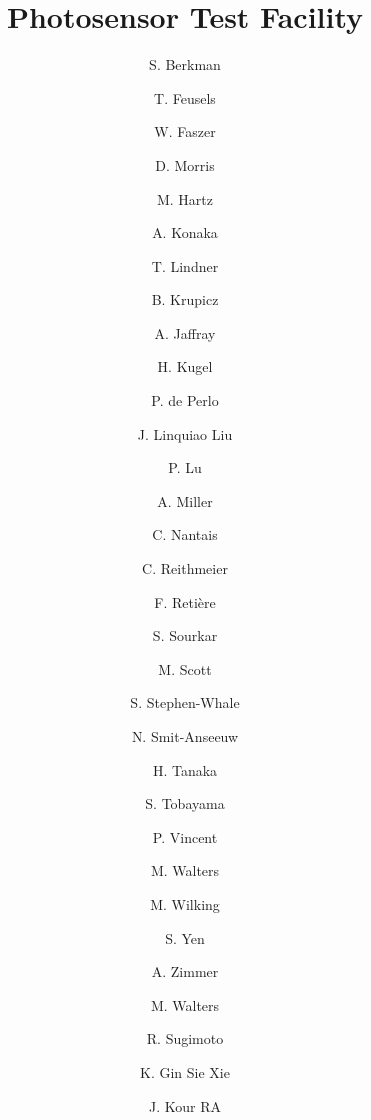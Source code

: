 \begin{frontmatter}


\title{Photosensor Test Facility}


\author[ins:ubc,ins:triu]{S. Berkman}
\author[ins:ubc,ins:triu]{T. Feusels}
\cortext[cor1]{}
\author[ins:triu]{W. Faszer}
\author[ins:triu]{D. Morris}
\author[ins:triu,ins:kav]{M. Hartz}
\author[ins:triu]{A. Konaka}
\author[ins:triu]{T. Lindner}
\author[]{B. Krupicz}
\author[]{A. Jaffray}
\author[]{H. Kugel}
\author[]{P. de Perlo}
\author[]{J. Linquiao Liu}
\author[]{P. Lu}
\author[ins:triu]{A. Miller}
\author[]{C. Nantais}
\author[]{C. Reithmeier}
\author[ins:triu]{F. Reti\`ere}
\author[]{S. Sourkar}
\author[ins:triu]{M. Scott}
\author[]{S. Stephen-Whale}
\author[]{N. Smit-Anseeuw}
\author[]{H. Tanaka}
\author[ins:ubc,ins:triu]{S. Tobayama}
\author[ins:triu]{P. Vincent}
\author[]{M. Walters}
\author[]{M. Wilking}
\author[ins:triu]{S. Yen}
\author[]{A. Zimmer}
\author[]{M. Walters}
\author[]{R. Sugimoto}
\author[]{K. Gin Sie Xie}
\author[]{J. Kour RA}



\address[ins:ubc]{University of British Columbia, Department of Physics and Astronomy, Vancouver, British Columbia, Canada}
\address[ins:triu]{TRIUMF, Vancouver, British Columbia, Canada}
\address[ins:kav]{Kavli Institute for the Physics and Mathematics of the Universe (WPI), The University
of Tokyo Institutes for Advanced Study, University of Tokyo, Kashiwa, Chiba, Japan}






\end{frontmatter}
